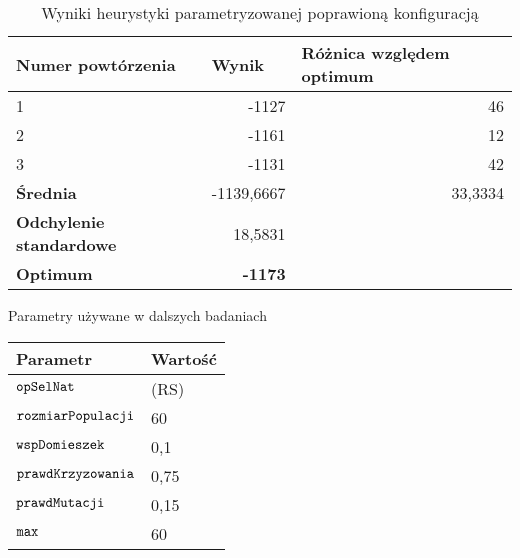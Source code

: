 \documentclass[./FM_mgr.tex]{subfiles}
\begin{document}
\begin{table}[H]
	\caption{Wyniki heurystyki parametryzowanej poprawioną konfiguracją \label{knapsack_tweak_results}}
	\centering
	\begin{tabular}{|l|r|r}
		\hline
		{\bf Numer powtórzenia}      & \multicolumn{1}{l|}{{\bf Wynik}} & \multicolumn{1}{l|}{{\bf Różnica względem optimum}} \\ \hline \hline
		1                                             & -1127                            & \multicolumn{1}{r|}{46}                             \\ \hline
		2                                             & -1161                            & \multicolumn{1}{r|}{12}                             \\ \hline
		3                                             & -1131                            & \multicolumn{1}{r|}{42}                             \\ \hline \hline
		{\bf Średnia}                                 & -1139,6667                       & \multicolumn{1}{r|}{33,3334}                        \\ \hline
		{\bf Odchylenie standardowe}                  & 18,5831                          &                                                     \\ \hhline{==~}
		{\bf Optimum}                                 & {\bf -1173}                      &                                                     \\ \cline{1-2}
	\end{tabular}
\end{table}


\begin{config}
	\caption{Parametry używane w dalszych badaniach \label{config:knapsack_base}}
	\centering
	\begin{tabular}{|l|l|}
		\hline
		\textbf{Parametr} & \multicolumn{1}{c|}{\textbf{Wartość}} \\
		\hline
		\hline
		$\mathtt{opSelNat}$ & \opName{natSel}(RS)\\
		\hline
		$\mathtt{rozmiarPopulacji}$                         & 60                      \\ \hline 
		$\mathtt{wspDomieszek}$                             & 0,1                    \\ \hline
		$\mathtt{prawdKrzyzowania}$ & 0,75 \\ \hline 
		$\mathtt{prawdMutacji}$ & 0,15             \\ \hline
		$\mathtt{max}$                                      & 60                     \\ \hline
	\end{tabular}
\end{config}
\end{document}
